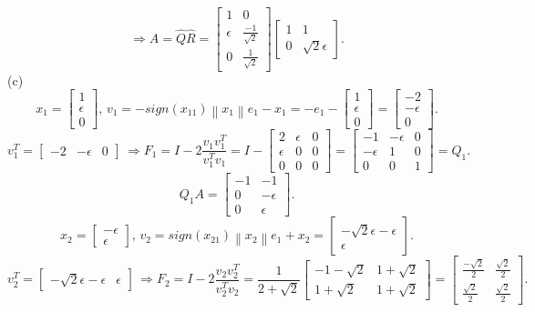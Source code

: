 \documentclass{article}
\begin{document}
\[\Rightarrow A=\hat{Q}\hat{R}=\begin{bmatrix}1&0\\\epsilon&\frac{-1}{\sqrt2}\\0&\frac{1}{\sqrt2}\end{bmatrix}\begin{bmatrix}1&1\\0&\sqrt2\epsilon\end{bmatrix}.\]
(c)\[x_1=\begin{bmatrix}1\\\epsilon\\0\end{bmatrix},\,v_1=-sign(x_{11})\left\lVert x_1\right\rVert e_1-x_1=-e_1-\begin{bmatrix}1\\\epsilon\\0\end{bmatrix}=\begin{bmatrix}-2\\-\epsilon\\0\end{bmatrix}.\]
\[v_1^T=\begin{bmatrix}-2&-\epsilon&0\end{bmatrix}\,\Rightarrow F_1=I-2\frac{v_1v_1^T}{v_1^Tv_1}=I-\begin{bmatrix}2&\epsilon&0\\\epsilon&0&0\\0&0&0\end{bmatrix}=\begin{bmatrix}-1&-\epsilon&0\\-\epsilon&1&0\\0&0&1\end{bmatrix}=Q_1.\]
\[Q_1A=\begin{bmatrix}-1&-1\\0&-\epsilon\\0&\epsilon\end{bmatrix}.\]
\[x_2=\begin{bmatrix}-\epsilon\\\epsilon\end{bmatrix},\,v_2=sign(x_{21})\left\lVert x_2\right\rVert e_1+x_2=\begin{bmatrix}-\sqrt2\epsilon-\epsilon\\\epsilon\end{bmatrix}.\]
\[v_2^T=\begin{bmatrix}-\sqrt2\epsilon-\epsilon&\epsilon\end{bmatrix}\,\Rightarrow F_2=I-2\frac{v_2v_2^T}{v_2^Tv_2}=\frac{1}{2+\sqrt2}\begin{bmatrix}-1-\sqrt2&1+\sqrt2\\1+\sqrt2&1+\sqrt2\end{bmatrix}=\begin{bmatrix}\frac{-\sqrt2}{2}&\frac{\sqrt2}{2}\\\frac{\sqrt2}{2}&\frac{\sqrt2}{2}\end{bmatrix}.\]
\end{document}
